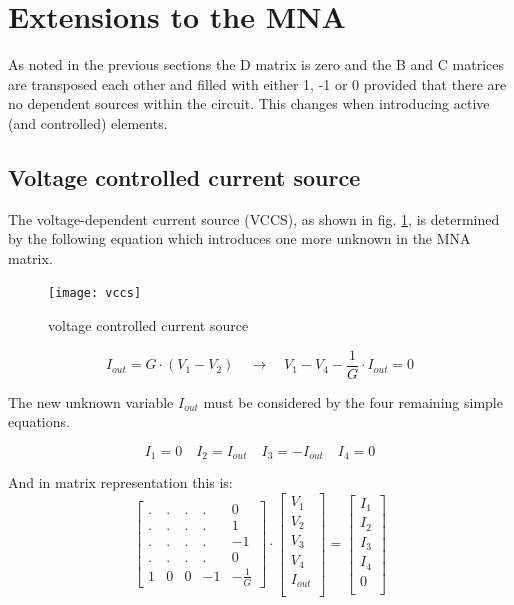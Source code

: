 \documentclass[10pt]{report}
\begin{document}
\section{Extensions to the MNA}
\label{sec:MNAext}

As noted in the previous sections the D matrix is zero and the B and C
matrices are transposed each other and filled with either 1, -1 or 0
provided that there are no dependent sources within the circuit.  This
changes when introducing active (and controlled) elements.

\subsection{Voltage controlled current source}

The voltage-dependent current source (VCCS), as shown in fig.
\ref{fig:vccs}, is determined by the following equation which
introduces one more unknown in the MNA matrix.

\begin{figure}[ht]
\begin{center}
\texttt{[image: vccs]}
\end{center}
\caption{voltage controlled current source}
\label{fig:vccs}
\end{figure}
\FloatBarrier

\begin{equation}
I_{out} = G\cdot\left(V_{1} - V_{2}\right)
\quad \rightarrow \quad
V_{1} - V_{4} - \frac{1}{G}\cdot I_{out} = 0
\label{eq:vccs}
\end{equation}

The new unknown variable $I_{out}$ must be considered by the four
remaining simple equations.

\begin{equation}
I_{1} = 0 \quad I_{2} = I_{out} \quad I_{3} = -I_{out} \quad I_{4} = 0
\end{equation}

And in matrix representation this is:
\begin{equation}
\begin{bmatrix}
.&.&.&.& 0\\
.&.&.&.& 1\\
.&.&.&.& -1\\
.&.&.&.& 0\\
1 & 0 & 0 & -1 & -\frac{1}{G}
\end{bmatrix}
\cdot
\begin{bmatrix}
V_{1}\\
V_{2}\\
V_{3}\\
V_{4}\\
I_{out}\\
\end{bmatrix}
=
\begin{bmatrix}
I_{1}\\
I_{2}\\
I_{3}\\
I_{4}\\
0\\
\end{bmatrix}
\end{equation}
\end{document}
